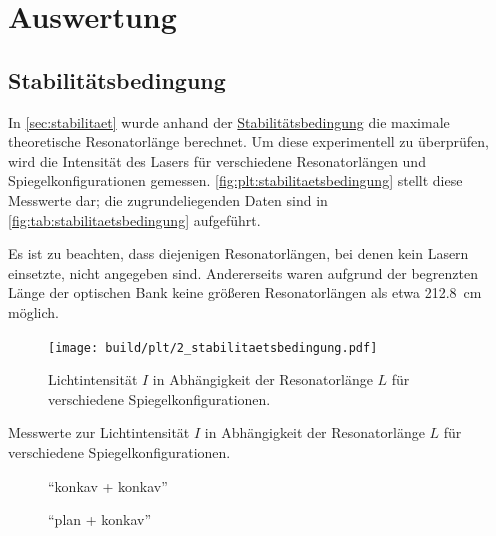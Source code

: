\section{Auswertung}
\label{sec:auswertung}

\subsection{Stabilitätsbedingung}
\label{sec:auswertung:stabilitaetsbedingung}

In \autoref{sec:stabilitaet} wurde anhand der \hyperref[eqn:stabilitaetsbedingung]{Stabilitätsbedingung} die maximale theoretische Resonatorlänge berechnet.
Um diese experimentell zu überprüfen,
wird die Intensität des Lasers für verschiedene Resonatorlängen und Spiegelkonfigurationen gemessen.
\autoref{fig:plt:stabilitaetsbedingung} stellt diese Messwerte dar; die zugrundeliegenden Daten sind in \autoref{fig:tab:stabilitaetsbedingung} aufgeführt.

Es ist zu beachten, dass diejenigen Resonatorlängen, bei denen kein Lasern einsetzte, nicht angegeben sind.
Andererseits waren aufgrund der begrenzten Länge der optischen Bank keine größeren Resonatorlängen als etwa \SI{212.8}{\centi\meter} möglich.

\begin{figure}
  \centering
   \texttt{[image: build/plt/2\_stabilitaetsbedingung.pdf]}
   \caption{Lichtintensität $I$ in Abhängigkeit der Resonatorlänge $L$ für verschiedene Spiegelkonfigurationen.}
   \label{fig:plt:stabilitaetsbedingung}
\end{figure}

\begin{table}
\centering
\caption{Messwerte zur Lichtintensität $I$ in Abhängigkeit der Resonatorlänge $L$ für verschiedene Spiegelkonfigurationen.}
\label{fig:tab:stabilitaetsbedingung}
\begin{subfigure}{.5\textwidth}
    \centering
    \caption{\enquote{konkav + konkav}}
\end{subfigure}%
\begin{subfigure}{.5\textwidth}
    \centering
    \caption{\enquote{plan + konkav}}
\end{subfigure}
\end{table}


